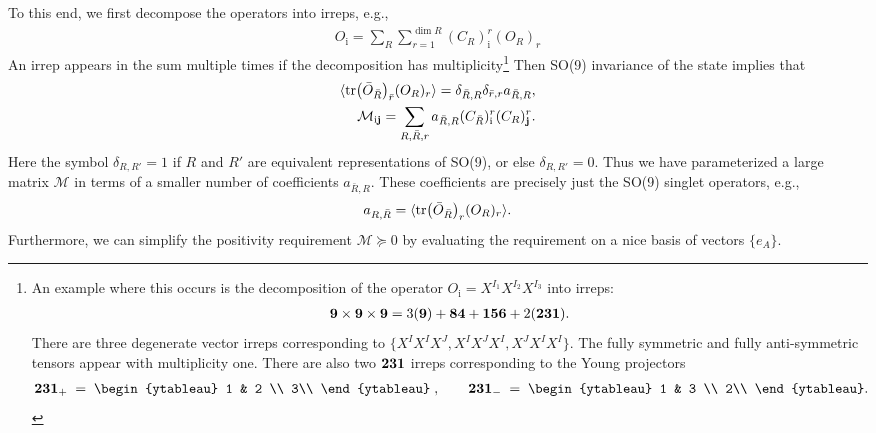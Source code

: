 \documentclass[11pt]{article}
\renewcommand{\ev}[1]{\langle #1 \rangle} %
\def\i{\mathrm{i}}
\begin{document}
To this end, we first decompose the operators into irreps, e.g.,%
\begin{align}
  O_\i = \sum_R  \sum_{r=1}^{\dim R} (C_R)^{r}_\i (O_R)_r 
\end{align}
An irrep appears in the sum multiple times if the decomposition has multiplicity\footnote{An example where this occurs is the decomposition of the operator $O_\i = X^{I_1} X^{I_2} X^{I_3}$ into irreps: 
\begin{align}
    {\bf 9} \times \mathbf{9} \times \mathbf{9} = 3 (\mathbf{9}) + \mathbf{84} + \mathbf{156} + 2 (\mathbf{231} ). \end{align}
    There are three degenerate vector irreps corresponding to $\{ X^{I} X^{I} X^J, X^{I} X^J X^I, X^J X^I X^I\}$. The fully symmetric and fully anti-symmetric tensors appear with multiplicity one. There are also two  ${\bf 231}$ irreps corresponding to the Young projectors
\def\id{\mathbf{1}}
\begin{align}
    {\bf 231_+ } \; =\; \begin{ytableau}
       1 & 2  \\
  3\\ \end{ytableau} \; , \qquad 
    {\bf 231_-} \; = \; \begin{ytableau}
       1 & 3  \\
  2\\ \end{ytableau} .
\end{align}
} %
Then SO(9) invariance of the state implies that 
\begin{align}
    \ev{\tr (\bar{O}_{\bar{R}})_{\bar{r}} (O_{R})_{r}} = \delta_{\bar{R},R} \delta_{\bar{r},r} a_{\bar{R},R},\\
        \mathcal{M}_{\i \j } = \sum_{R,\bar{R}, r} a_{\bar{R}, R} (C_{\bar R})_\i^r (C_R)_\j^r.
\end{align}
Here the symbol $\delta_{R,R'} = 1$ if $R$ and $R'$ are equivalent representations of SO(9), or else $\delta_{R,R'} = 0$. Thus we have parameterized a large matrix $\mathcal{M}$ in terms of a smaller number of coefficients $a_{\bar{R}, R}$. 
These coefficients are precisely just the SO(9) singlet operators, e.g.,
\begin{align}
    a_{R,\bar{R}} = \ev{\tr (\bar{O}_{\bar{R}})_{r} (O_{R})_{r}}.
\end{align}
Furthermore, we can simplify the positivity requirement $\mathcal{M} \succeq 0$ by evaluating the requirement on a nice basis of vectors $\{ e_A\} $. %
\end{document}
